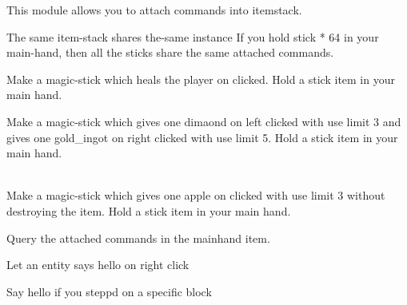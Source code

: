 
This module allows you to attach commands into itemstack.


\begin{note}{The same item-stack shares the-same instance}
    If you hold stick * 64 in your main-hand, then all the sticks share the same attached commands.
\end{note}

\begin{example}{Make a magic-stick which heals the player on clicked.}
    Hold a stick item in your main hand.\\
\end{example}

\begin{example}{Make a magic-stick which gives one dimaond on left clicked with use limit 3 and gives one gold\_ingot on right clicked with use limit 5.}
    Hold a stick item in your main hand.\\
    \\
\end{example}

\begin{example}{Make a magic-stick which gives one apple on clicked with use limit 3 without destroying the item.}
    Hold a stick item in your main hand.\\
\end{example}

\begin{example}{Query the attached commands in the mainhand item.}
\end{example}

\begin{example}{Let an entity says hello on right click}
\end{example}

\begin{example}{Say hello if you steppd on a specific block}
\end{example}
